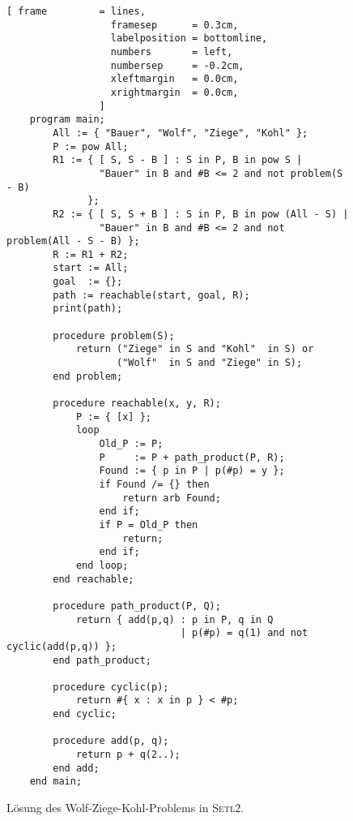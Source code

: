 \begin{figure}[!h]
\centering
\begin{Verbatim}[ frame         = lines, 
                  framesep      = 0.3cm, 
                  labelposition = bottomline,
                  numbers       = left,
                  numbersep     = -0.2cm,
                  xleftmargin   = 0.0cm,
                  xrightmargin  = 0.0cm,
                ]
    program main;
        All := { "Bauer", "Wolf", "Ziege", "Kohl" };
        P := pow All;
        R1 := { [ S, S - B ] : S in P, B in pow S |
                "Bauer" in B and #B <= 2 and not problem(S - B) 
              };
        R2 := { [ S, S + B ] : S in P, B in pow (All - S) |
                "Bauer" in B and #B <= 2 and not problem(All - S - B) };
        R := R1 + R2;
        start := All;
        goal  := {};
        path := reachable(start, goal, R);
        print(path);

        procedure problem(S);
            return ("Ziege" in S and "Kohl"  in S) or
                   ("Wolf"  in S and "Ziege" in S);
        end problem;

        procedure reachable(x, y, R);
            P := { [x] };
            loop
                Old_P := P;
                P     := P + path_product(P, R);
                Found := { p in P | p(#p) = y };
                if Found /= {} then
                    return arb Found;
                end if;
                if P = Old_P then
                    return;
                end if;
            end loop;
        end reachable;

        procedure path_product(P, Q);
            return { add(p,q) : p in P, q in Q 
                              | p(#p) = q(1) and not cyclic(add(p,q)) };
        end path_product;    

        procedure cyclic(p);
            return #{ x : x in p } < #p;
        end cyclic;

        procedure add(p, q);
            return p + q(2..);
        end add;    
    end main;
\end{Verbatim}
\vspace*{-0.3cm}
\caption{L\"osung des Wolf-Ziege-Kohl-Problems in \textsc{Setl2}.}
\label{fig:wolf-ziege-kohl.stl}
\end{figure}

